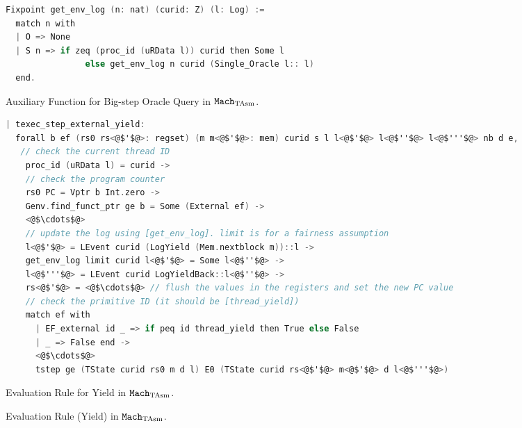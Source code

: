 \begin{figure}
\begin{lstlisting}[language=C]
Fixpoint get_env_log (n: nat) (curid: Z) (l: Log) :=
  match n with
  | O => None
  | S n => if zeq (proc_id (uRData l)) curid then Some l
                else get_env_log n curid (Single_Oracle l:: l)
  end.
\end{lstlisting}
\begin{center}
Auxiliary Function for Big-step Oracle Query in ${\mathrm{\texttt{Mach}}}_{\mathrm{TAsm}}$.
\end{center}

\begin{lstlisting}[language=C]
| texec_step_external_yield:
  forall b ef (rs0 rs<@$'$@>: regset) (m m<@$'$@>: mem) curid s l l<@$'$@> l<@$''$@> l<@$'''$@> nb d e,
   // check the current thread ID
    proc_id (uRData l) = curid ->
    // check the program counter
    rs0 PC = Vptr b Int.zero ->
    Genv.find_funct_ptr ge b = Some (External ef) ->
    <@$\cdots$@>
    // update the log using [get_env_log]. limit is for a fairness assumption
    l<@$'$@> = LEvent curid (LogYield (Mem.nextblock m))::l ->
    get_env_log limit curid l<@$'$@> = Some l<@$''$@> ->
    l<@$'''$@> = LEvent curid LogYieldBack::l<@$''$@> ->
    rs<@$'$@> = <@$\cdots$@> // flush the values in the registers and set the new PC value
    // check the primitive ID (it should be [thread_yield])
    match ef with 
      | EF_external id _ => if peq id thread_yield then True else False
      | _ => False end ->
	  <@$\cdots$@>
      tstep ge (TState curid rs0 m d l) E0 (TState curid rs<@$'$@> m<@$'$@> d l<@$'''$@>)
\end{lstlisting}
\begin{center}
Evaluation Rule for Yield in  ${\mathrm{\texttt{Mach}}}_{\mathrm{TAsm}}$.
\end{center}
\caption{Evaluation Rule (Yield) in ${\mathrm{\texttt{Mach}}}_{\mathrm{TAsm}}$.}
\label{fig:chapter:conlink:yield-rule-in-tasm}
\end{figure}


